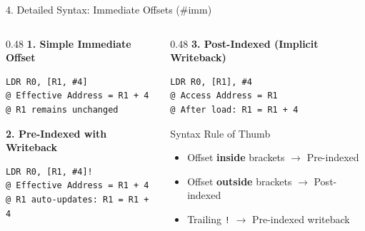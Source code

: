 \documentclass[aspectratio=169,10pt]{beamer}
\begin{document}
\begin{frame}[fragile]{4. Detailed Syntax: Immediate Offsets (\#imm)}
  \begin{columns}[T]
    \begin{column}{0.48\textwidth}
      \textbf{1. Simple Immediate Offset}
      \begin{lstlisting}
LDR R0, [R1, #4]
@ Effective Address = R1 + 4
@ R1 remains unchanged
      \end{lstlisting}

      \vspace{0.2cm}
      \textbf{2. Pre-Indexed with Writeback}
      \begin{lstlisting}
LDR R0, [R1, #4]!
@ Effective Address = R1 + 4
@ R1 auto-updates: R1 = R1 + 4
      \end{lstlisting}
    \end{column}

    \begin{column}{0.48\textwidth}
      \textbf{3. Post-Indexed (Implicit Writeback)}
      \begin{lstlisting}
LDR R0, [R1], #4
@ Access Address = R1
@ After load: R1 = R1 + 4
      \end{lstlisting}

      \vspace{0.2cm}
      \begin{alertblock}{Syntax Rule of Thumb}
        \begin{itemize}
          \item Offset \textbf{inside} brackets $\rightarrow$ Pre-indexed
          \item Offset \textbf{outside} brackets $\rightarrow$ Post-indexed
          \item Trailing \texttt{!} $\rightarrow$ Pre-indexed writeback
        \end{itemize}
      \end{alertblock}
    \end{column}
  \end{columns}
\end{frame}
\end{document}
